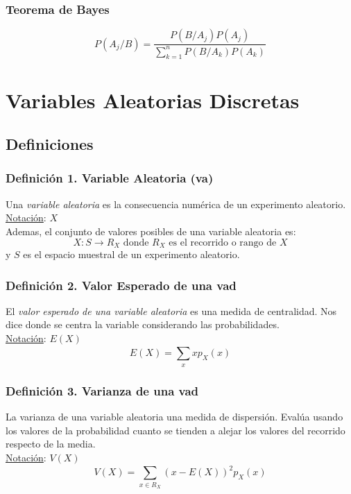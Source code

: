 \documentclass{article}
\newcommand{\sumatoria}[2]{\sum_{#1} ^{#2}}
\begin{document}
\subsubsection*{Teorema de Bayes}
\begin{equation*}
    P(A_j/B) = \frac{P(B/A_j)P(A_j)}{\sumatoria{k=1}{n}P(B/A_k)P(A_k)}
\end{equation*}

\newpage
\section{Variables Aleatorias Discretas}
\subsection{Definiciones}
\subsubsection*{Definición 1. Variable Aleatoria (va)}
Una \emph{variable aleatoria} es la consecuencia numérica de un experimento aleatorio.
\\\underline{Notación}: $X$
\\Ademas, el conjunto de valores posibles de una variable aleatoria es:
\begin{equation*}
    X: S \rightarrow R_X \text{ donde $R_X$ es el recorrido o rango de $X$} 
\end{equation*}
y $S$ es el espacio muestral de un experimento aleatorio.

\subsubsection*{Definición 2. Valor Esperado de una vad}
El \emph{valor esperado de una variable aleatoria} es una medida de centralidad. Nos dice donde se centra la variable considerando las probabilidades.
\\\underline{Notación}: $E(X)$
\begin{equation*}
    E(X) = \sumatoria{x}{} x p_X(x)
\end{equation*}

\subsubsection*{Definición 3. Varianza de una vad}
La varianza de una variable aleatoria una medida de dispersión. Evalúa usando los valores de la probabilidad cuanto se tienden a alejar los valores del recorrido respecto de la media.
\\\underline{Notación}: $V(X)$
\begin{equation*}
    V(X) = \sumatoria{x \in R_X}{} (x - E(X))^2 p_X(x)
\end{equation*}
\end{document}
